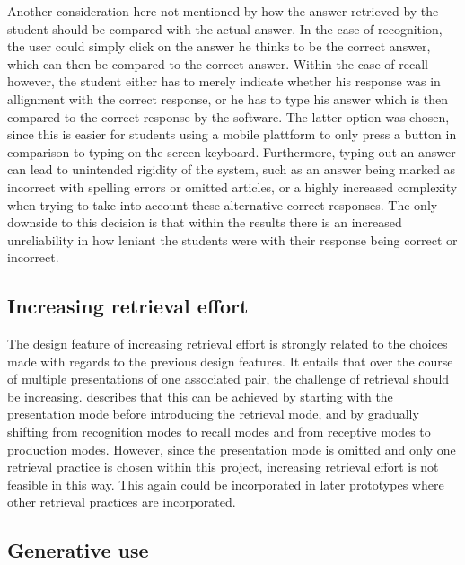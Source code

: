 Another consideration here not mentioned by  how the answer retrieved by the student should be compared with the actual answer. In the case of recognition, the user could simply click on the answer he thinks to be the correct answer, which can then be compared to the correct answer. Within the case of recall however, the student either has to merely indicate whether his response was in allignment with the correct response, or he has to type his answer which is then compared to the correct response by the software. The latter option was chosen, since this is easier for students using a mobile plattform to only press a button in comparison to typing on the screen keyboard. Furthermore, typing out an answer can lead to unintended rigidity of the system, such as an answer being marked as incorrect with spelling errors or omitted articles, or a highly increased complexity when trying to take into account these alternative correct responses. The only downside to this decision is that within the results there is an increased unreliability in how leniant the students were with their response being correct or incorrect.

        \subsection{Increasing retrieval effort}

The design feature of increasing retrieval effort is strongly related to the choices made with regards to the previous design features. It entails that over the course of multiple presentations of one associated pair, the challenge of retrieval should be increasing.  describes that this can be achieved by starting with the presentation mode before introducing the retrieval mode, and by gradually shifting from recognition modes to recall modes and from receptive modes to production modes. However, since the presentation mode is omitted and only one retrieval practice is chosen within this project, increasing retrieval effort is not feasible in this way. This again could be incorporated in later prototypes where other retrieval practices are incorporated.

        \subsection{Generative use}

